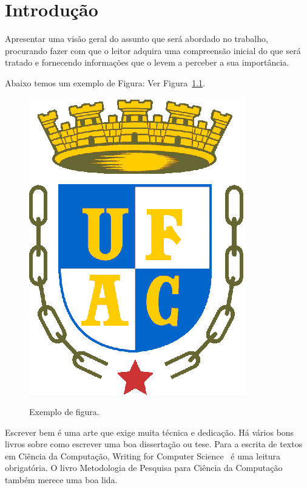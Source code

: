 \documentclass[
	12pt,				    %
	openright,			    %
	oneside,			    %
	a4paper,			    %
    sumario=tradicional,        %
	english,			    %
	brazil,				    %
 ]{abntex2}
\begin{document}
\chapter{Introdução}\label{sec:introducao}
Apresentar uma visão geral do assunto que será abordado no trabalho, procurando fazer com que o leitor adquira uma compreensão inicial do que será tratado e fornecendo informações que o levem a perceber a sua importância.

Abaixo temos um exemplo de Figura: Ver Figura~\ref{fig:exefig}.

\begin{figure}[h!]
    \centering
    \caption{Exemplo de figura.}
    \includegraphics[width=0.3\linewidth]{figuras/exefig.eps}
    \label{fig:exefig}
\end{figure}

Escrever bem é uma arte que exige muita técnica e dedicação. Há vários bons livros sobre como escrever uma boa dissertação ou tese. Para a escrita de textos em Ciência da Computação, Writing for Computer Science~\cite{zobel2014} é uma leitura obrigatória. O livro Metodologia de Pesquisa para Ciência da Computação~\cite{wazlawick2009} também merece uma boa lida.
\end{document}
